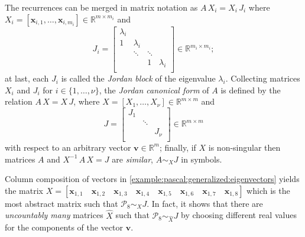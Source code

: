 The recurrences can be merged in matrix notation as $A\,X_{i} = X_{i}\,J_{i}$
where $\displaystyle X_{i}  = \left[\boldsymbol{x}_{i,1},\ldots,\boldsymbol{x}_{i,m_{i}}
\right]\in\mathbb{R}^{m\times m_{i}}$ and
\begin{displaymath}
J_{i}   = \left[ \begin{array}{cccc}
    \lambda_{i} \\
    1 & \lambda_{i} \\
      & \ddots & \ddots \\
      & & 1 &\lambda_{i} \\
\end{array} \right] \in\mathbb{R}^{m_{i}\times m_{i}};
\end{displaymath}
at last, each $J_{i}$ is called the \textit{Jordan block} of the eigenvalue
$\lambda_{i}$.  Collecting matrices $X_{i}$ and $J_{i}$ for $i\in \lbrace
1,\ldots,\nu \rbrace$, the \textit{Jordan canonical form} of $A$ is defined by
the relation $A\,X = X\, J$, where $\displaystyle X =
\left[X_{1},\ldots,X_{\nu} \right]\in\mathbb{R}^{m\times m}$ and
\begin{displaymath}
J = \left[ \begin{array}{ccc}
    J_{1} \\
      & \ddots \\
      & & J_{\nu} \\
\end{array} \right] \in\mathbb{R}^{m\times m}
\end{displaymath}
with respect to an arbitrary vector $\boldsymbol{v}\in\mathbb{R}^{m}$; finally, if $X$ is
non-singular then matrices $A$ and $X^{-1}\,A\,X = J$ are \textit{similar}, $A
\sim_{X} J$ in symbols.

\begin{remark}
Column composition of vectors in \ref{example:pascal:generalized:eigenvectors}
yields the matrix
$\displaystyle X = \left[\boldsymbol{x}_{1,1}\quad\boldsymbol{x}_{1,2}\quad
\boldsymbol{x}_{1,3}\quad\boldsymbol{x}_{1,4}\quad
\boldsymbol{x}_{1,5}\quad\boldsymbol{x}_{1,6}\quad\boldsymbol{x}_{1,7}\quad
\boldsymbol{x}_{1,8}\right]$
which is the most abstract matrix such that $\mathcal{P}_{8} \sim_{X} J$.
In fact, it shows that there are \textit{uncountably many} matrices $\hat{X}$
such that $\mathcal{P}_{8} \sim_{\hat{X}} J$ by choosing different real values for
the components of the vector $\boldsymbol{v}$.
\end{remark}

